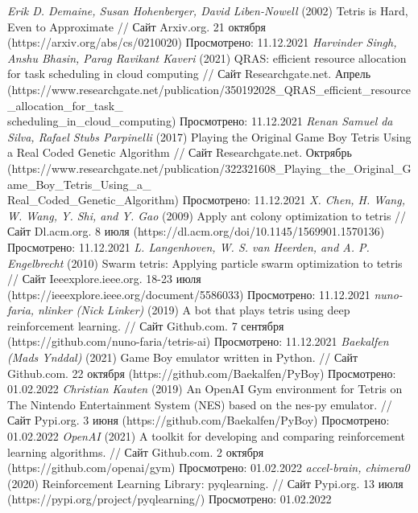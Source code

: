 \documentclass{article}
\begin{document}
\newpage
\begin{center}
\begin{thebibliography}{}
  \textit{Erik D. Demaine, Susan Hohenberger, David Liben-Nowell} (2002) Tetris is Hard, Even to Approximate // Сайт Arxiv.org. 21 октября (https://arxiv.org/abs/cs/0210020) Просмотрено: 11.12.2021
  \textit{Harvinder Singh, Anshu Bhasin, Parag Ravikant Kaveri} (2021) QRAS: efficient resource allocation for task scheduling in cloud computing // Сайт Researchgate.net. Апрель (https://www.researchgate.net/publication/350192028\_QRAS\_efficient\_resource\_allocation\_for\_task\_\\scheduling\_in\_cloud\_computing) Просмотрено: 11.12.2021
 \textit{Renan Samuel da Silva, Rafael Stubs Parpinelli} (2017) Playing the Original Game Boy Tetris Using a Real Coded Genetic Algorithm // Сайт Researchgate.net. Октрябрь (https://www.researchgate.net/publication/322321608\_Playing\_the\_Original\_Game\_Boy\_Tetris\_Using\_a\_\\Real\_Coded\_Genetic\_Algorithm) Просмотрено: 11.12.2021
 \textit{X. Chen, H. Wang, W. Wang, Y. Shi, and Y. Gao} (2009) Apply ant colony optimization to tetris // Сайт Dl.acm.org. 8 июля (https://dl.acm.org/doi/10.1145/1569901.1570136) Просмотрено: 11.12.2021
 \textit{L. Langenhoven, W. S. van Heerden, and A. P. Engelbrecht} (2010) Swarm tetris: Applying particle swarm optimization to tetris // Сайт Ieeexplore.ieee.org. 18-23 июля (https://ieeexplore.ieee.org/document/5586033) Просмотрено: 11.12.2021
 \textit{nuno-faria, nlinker (Nick Linker)} (2019) A bot that plays tetris using deep reinforcement learning. // Сайт Github.com. 7 сентября (https://github.com/nuno-faria/tetris-ai) Просмотрено: 11.12.2021
 \textit{Baekalfen (Mads Ynddal)} (2021) Game Boy emulator written in Python. // Сайт Github.com. 22 октября (https://github.com/Baekalfen/PyBoy) Просмотрено: 01.02.2022
 \textit{Christian Kauten} (2019) An OpenAI Gym environment for Tetris on The Nintendo Entertainment System (NES) based on the nes-py emulator. // Сайт Pypi.org. 3 июня (https://github.com/Baekalfen/PyBoy) Просмотрено: 01.02.2022
 \textit{OpenAI} (2021) A toolkit for developing and comparing reinforcement learning algorithms. // Сайт Github.com. 2 октября (https://github.com/openai/gym) Просмотрено: 01.02.2022
 \textit{accel-brain, chimera0} (2020) Reinforcement Learning Library: pyqlearning. // Сайт Pypi.org. 13 июля (https://pypi.org/project/pyqlearning/) Просмотрено: 01.02.2022

\end{thebibliography}
\end{center}
\end{document}
